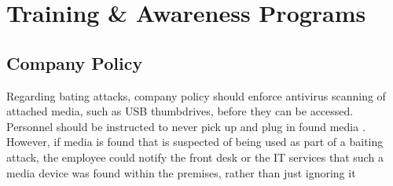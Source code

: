 



\chapter{Training \& Awareness Programs\label{trainingawareness}}

\section{Company Policy}

Regarding bating attacks, company policy should enforce antivirus scanning of attached media, such as USB thumbdrives, before they can be accessed. Personnel should be instructed to never pick up and plug in found media \citep{salahdine_social_2019}. However, if media is found that is suspected of being used as part of a baiting attack, the employee could notify the front desk or the IT services that such a media device was found within the premises, rather than just ignoring it 
